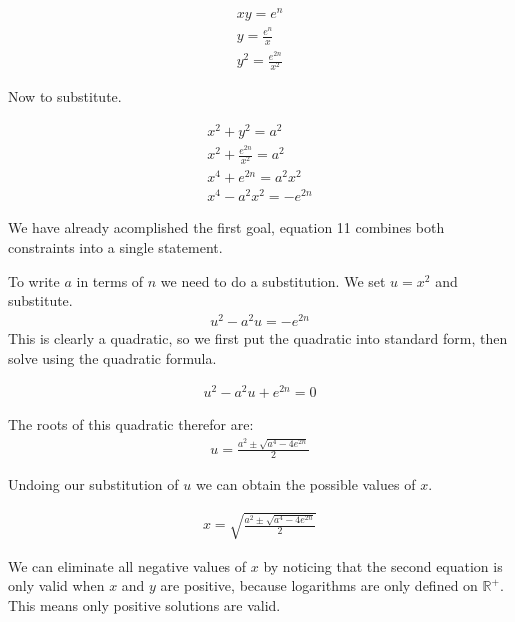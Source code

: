 \documentclass{report}
\begin{document}
\begin{description}
\begin{mdframed}
            \begin{gather}
                xy = e^n\\
                y = \frac{e^n}{x}\\ 
                y^2 = \frac{e^{2n}}{x^2}
            \end{gather}

            Now to substitute.

            \begin{gather}
                x^2 + y^2 = a^2\\ 
                x^2 + \frac{e^{2n}}{x^2} = a^2\\
                x^4 + e^{2n} = a^2 x^2\\
                x^4 - a^2 x^2 = -e^{2n}
            \end{gather}

            We have already acomplished the first goal,
            equation 11 combines both constraints into a single
            statement.

            \vspace{10pt}

            To write $a$ in terms of $n$ we need to do a
            substitution. We set $u = x^2$ and substitute.
            \begin{gather}
                u^2 - a^2 u = -e^{2n}    
            \end{gather}
            This is clearly a quadratic, so we first put
            the quadratic into standard form, then solve using
            the quadratic formula.

            \begin{gather}
                u^2 - a^2 u + e^{2n} = 0 
            \end{gather}

            The roots of this quadratic therefor are:
            \begin{gather}
                u = \frac{a^2 \pm \sqrt{a^4 - 4e^{2n}}}{2} 
            \end{gather}

            Undoing our substitution of $u$ we can obtain
            the possible values of $x$.

            \begin{gather}
                x = \sqrt{\frac{a^2 \pm \sqrt{a^4 - 4e^{2n}}}{2}}     
            \end{gather}

            We can eliminate all negative values of $x$ by noticing
            that the second equation is only valid when $x$ and
            $y$ are positive, because logarithms are only defined
            on $\mathbb{R}^+$. This means only positive solutions
            are valid.


\end{mdframed}
\end{description}
\end{document}

